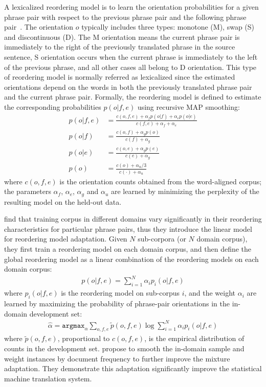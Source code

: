 A lexicalized reordering model is to learn the orientation probabilities for a given phrase pair with respect to the previous phrase pair and the following phrase pair~\citep{Chen-2013}. The orientation $o$ typically includes three types: monotone (M), swap (S) and discontinuous (D). The M orientation means the current phrase pair is immediately to the right of the previously translated phrase in the source sentence, S orientation occurs when the current phrase is immediately to the left of the previous phrase, and all other cases all belong to D orientation. This type of reordering model is normally referred as lexicalized since the estimated orientations depend on the words in both the previously translated phrase pair and the current phrase pair. Formally, the reordering model is defined to estimate the corresponding probabilities $p(o|f,e)$ using recursive MAP smoothing:
\begin{align}
p(o|f,e) &= \frac{c(o,f,e) + \alpha_f p(o|f) + \alpha_e p(o|e)}{c(f,e) + \alpha_f + \alpha_e} \\
p(o|f) &= \frac{c(o,f) + \alpha_g p(o)}{c(f) + \alpha_g} \\
p(o|e) &= \frac{c(o,e) + \alpha_g p(e)}{c(e) + \alpha_g} \\
p(o) &= \frac{c(o) + \alpha_u/3}{c(\cdot) + \alpha_u}
\end{align}
where $c(o,f,e)$ is the orientation counts obtained from the word-aligned corpus;  the parameters $\alpha_f$, $\alpha_e$, $\alpha_g$ and $\alpha_u$ are learned by minimizing the perplexity of the resulting model on the held-out data.

\citet{Chen-2013} find that training corpus in different domains vary significantly in their reordering characteristics for particular phrase pairs, thus they introduce the linear model for reordering model adaptation. Given $N$ sub-corpora (or $N$ domain corpus), they first train a reordering model on each domain corpus, and then define the global reordering model as a linear combination of the reordering models on each domain corpus:
\begin{align}
p(o|f,e) = \sum_{i=1}^{N} \alpha_i p_i(o|f,e)
\end{align}
where $p_i(o|f,e)$ is the reordering model on sub-corpus $i$, and the weight $\alpha_i$ are learned by maximizing the probability of phrase-pair orientations in the in-domain development set:
\begin{align}
\hat{\alpha} = \texttt{argmax}_{\alpha} \sum_{o,f,e} \tilde{p}(o,f,e) \log \sum_{i=1}^N \alpha_i p_i(o|f,e)
\end{align}
where $\tilde{p}(o,f,e)$, proportional to $c(o,f,e)$, is the empirical distribution of counts in the development set. \citet{Chen-2013} propose to smooth the in-domain sample and weight instances by document frequency to further improve the mixture adaptation. They demonstrate this adaptation significantly improve the statistical machine translation system.

